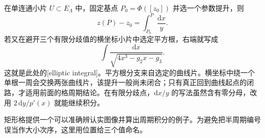 \ProseParagraphBreak

在单连通小片 \(U\subset E_\Lambda\) 中，固定基点 \(P_0=\Phi([z_0])\) 并选一个参数提升，则
\[
 z(P)-z_0=\int_{P_0}^P\frac{\mathrm dx}{y}.
\]
若又在避开三个有限分歧值的横坐标小片中选定平方根，右端就写成
\[
 \int\frac{\mathrm dx}{\sqrt{4x^3-g_2x-g_3}}.
\]
这就是此处的[elliptic integral]。平方根分支来自选定的曲线片。横坐标中绕一个单根一周会交换两张曲线片，该提升一般尚未闭合；只有真正回到曲线起点的闭路，才适用前面的格周期结论。在有限分歧点，\(\mathrm dx/y\) 的写法虽然含有零分母，改用 \(2\,\mathrm dy/p'(x)\) 就能继续积分。

\ProseParagraphBreak

矩形格提供一个可以准确辨认实图像并算出周期积分的例子。为避免把半周期编号误当作大小次序，这里用位置给三个值命名。

